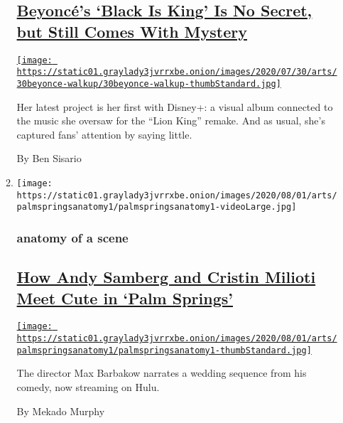 \begin{enumerate}
\begin{enumerate}
    \hypertarget{beyoncuxe9s-black-is-king-is-no-secret-but-still-comes-with-mystery}{%
    \subsection{\texorpdfstring{\href{/2020/07/30/arts/music/beyonce-black-is-king.html}{Beyoncé's
    `Black Is King' Is No Secret, but Still Comes With
    Mystery}}{Beyoncé's `Black Is King' Is No Secret, but Still Comes With Mystery}}\label{beyoncuxe9s-black-is-king-is-no-secret-but-still-comes-with-mystery}}

    \href{/2020/07/30/arts/music/beyonce-black-is-king.html}{\texttt{[image: https://static01.graylady3jvrrxbe.onion/images/2020/07/30/arts/30beyonce-walkup/30beyonce-walkup-thumbStandard.jpg]}}

    Her latest project is her first with Disney+: a visual album
    connected to the music she oversaw for the ``Lion King'' remake. And
    as usual, she's captured fans' attention by saying little.

    By Ben Sisario
  \item
    \texttt{[image: https://static01.graylady3jvrrxbe.onion/images/2020/08/01/arts/palmspringsanatomy1/palmspringsanatomy1-videoLarge.jpg]}

    \hypertarget{anatomy-of-a-scene}{%
    \subsubsection{anatomy of a scene}\label{anatomy-of-a-scene}}

    \hypertarget{how-andy-samberg-and-cristin-milioti-meet-cute-in-palm-springs}{%
    \subsection{\texorpdfstring{\href{/2020/07/31/movies/palm-springs-clip-hulu.html}{How
    Andy Samberg and Cristin Milioti Meet Cute in `Palm
    Springs'}}{How Andy Samberg and Cristin Milioti Meet Cute in `Palm Springs'}}\label{how-andy-samberg-and-cristin-milioti-meet-cute-in-palm-springs}}

    \href{/2020/07/31/movies/palm-springs-clip-hulu.html}{\texttt{[image: https://static01.graylady3jvrrxbe.onion/images/2020/08/01/arts/palmspringsanatomy1/palmspringsanatomy1-thumbStandard.jpg]}}

    The director Max Barbakow narrates a wedding sequence from his
    comedy, now streaming on Hulu.

    By Mekado Murphy
  \end{enumerate}
\end{enumerate}

